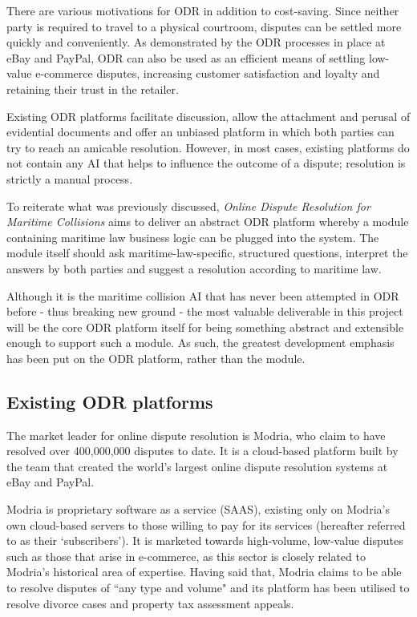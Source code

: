 There are various motivations for ODR in addition to cost-saving. Since neither party is required to travel to a physical courtroom, disputes can be settled more quickly and conveniently. As demonstrated by the ODR processes in place at eBay and PayPal, ODR can also be used as an efficient means of settling low-value e-commerce disputes, increasing customer satisfaction and loyalty and retaining their trust in the retailer.

Existing ODR platforms facilitate discussion, allow the attachment and perusal of evidential documents and offer an unbiased platform in which both parties can try to reach an amicable resolution. However, in most cases, existing platforms do not contain any AI that helps to influence the outcome of a dispute; resolution is strictly a manual process.

To reiterate what was previously discussed, \emph{Online Dispute Resolution for Maritime Collisions} aims to deliver an abstract ODR platform whereby a module containing maritime law business logic can be plugged into the system. The module itself should ask maritime-law-specific, structured questions, interpret the answers by both parties and suggest a resolution according to maritime law.

Although it is the maritime collision AI that has never been attempted in ODR before - thus breaking new ground - the most valuable deliverable in this project will be the core ODR platform itself for being something abstract and extensible enough to support such a module. As such, the greatest development emphasis has been put on the ODR platform, rather than the module.

\subsection{Existing ODR platforms}

The market leader for online dispute resolution is Modria, who claim to have resolved over 400,000,000 disputes to date. It is a cloud-based platform built by the team that created the world's largest online dispute resolution systems at eBay and PayPal.~\cite{modria:about}

Modria is proprietary software as a service (SAAS), existing only on Modria's own cloud-based servers to those willing to pay for its services (hereafter referred to as their `subscribers'). It is marketed towards high-volume, low-value disputes such as those that arise in e-commerce, as this sector is closely related to Modria's historical area of expertise. Having said that, Modria claims to be able to resolve disputes of ``any type and volume" and its platform has been utilised to resolve divorce cases and property tax assessment appeals.~\cite{modria:interview}


